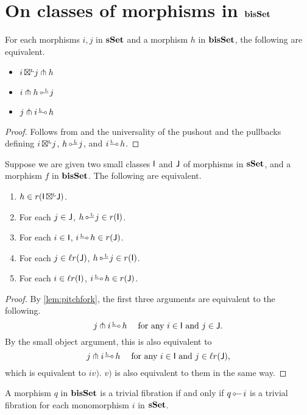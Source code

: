 \documentclass[a4paper,  dvipsnames, 11pt]{amsart}
\begin{document}
\section{On classes of morphisms in \texorpdfstring{$\mathbf{bisSet}$}{bisSet}}
\begin{lemma}
	\label{lem:pitchfork}
	For each morphisms $i,j$ in $\mathbf{sSet}$ and a morphism $h$ in $\mathbf{bisSet}$, the following are equivalent.
	\begin{itemize}
		\item %
			$i{\mathrel{\,\boxtimes^{\text{\tiny{L}}}}} j\pitchfork h$
		\item %
			$i\pitchfork h\lollipopL j$
		\item %
			$j\pitchfork i\rollipopL h$
	\end{itemize}
\end{lemma}
\begin{proof}
	Follows from  and the universality of the pushout and the pullbacks defining
	$i{\mathrel{\,\boxtimes^{\text{\tiny{L}}}}} j$, $h\lollipopL j$, and $i\rollipopL h$.
\end{proof}
\begin{lemma}
	\label{lem:rIbtJ}
	Suppose we are given two small classes $\mathsf{I}$ and $\mathsf{J}$ of morphisms in $\mathbf{sSet}$, and a morphism $f$ in $\mathbf{bisSet}$.
	The following are equivalent.
	\begin{enumerate}
		\item %
			$h\in r(\mathsf{I}{\mathrel{\,\boxtimes^{\text{\tiny{L}}}}}\mathsf{J})$.
		\item %
			For each $j\in\mathsf{J}$, $h\lollipopL j\in r(\I)$.
		\item %
			For each $i\in\mathsf{I}$, $i\rollipopL h\in r(\J)$.
		\item %
			For each $j\in\ell r(\mathsf{J})$, $h\lollipopL j\in r(\I)$.
		\item %
			For each $i\in\ell r(\mathsf{I})$, $i\rollipopL h\in r(\J)$.
	\end{enumerate}
\end{lemma}
\begin{proof}
	By \cref{lem:pitchfork}, the first three arguments are equivalent to the following.
	\[
		j \pitchfork i\rollipopL h
		\hspace{3ex}
		\text{for any $i\in\I$ and $j\in\J$.}
	\]
	By the small object argument,
	this is also equivalent to
	\[
		j \pitchfork i\rollipopL h
		\hspace{3ex}
		\text{for any $i\in\I$ and $j\in\ell r(\J)$,}
	\]
	which is equivalent to $iv)$.
	$v)$ is also equivalent to them in the same way.
\end{proof}
\begin{corollary}
	\label{cor:biTrivfib}
	A morphism $q$ in $\mathbf{bisSet}$ is a trivial fibration
	if and only if
	$q\lollipop i$ is a trivial fibration
	for each monomorphism $i$ in $\mathbf{sSet}$.
\end{corollary}
\end{document}
